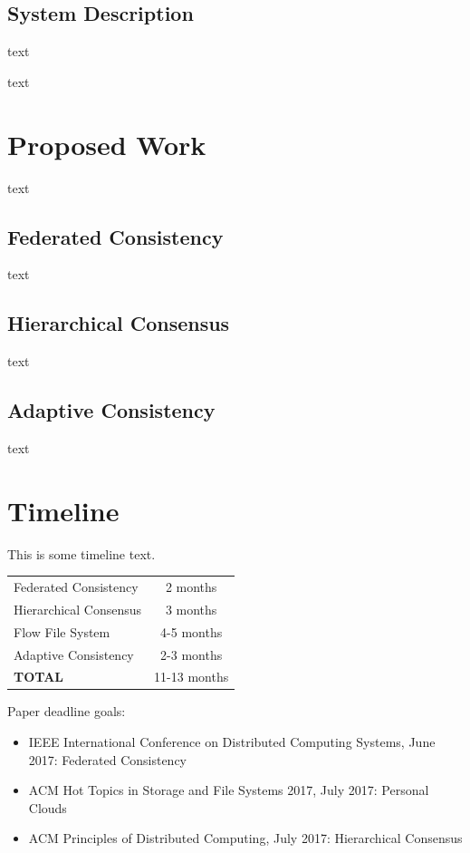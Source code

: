 \documentclass{article}
\begin{document}
\subsection{System Description}

text



text

\section{Proposed Work}

text

\subsection{Federated Consistency}

text

\subsection{Hierarchical Consensus}

text

\subsection{Adaptive Consistency}

text

\section{Timeline}

This is some timeline text.

\begin{center}
\begin{tabular}{|l|c|}
\hline
Federated Consistency & 2 months \\
Hierarchical Consensus & 3 months \\
Flow File System & 4-5 months \\
Adaptive Consistency & 2-3 months \\
\hline
\textbf{TOTAL} & 11-13 months \\
\hline
\end{tabular}
\end{center}

Paper deadline goals:

\begin{itemize}
\item IEEE International Conference on Distributed Computing Systems, June 2017: Federated Consistency
\item ACM Hot Topics in Storage and File Systems 2017, July 2017: Personal Clouds
\item ACM Principles of Distributed Computing, July 2017: Hierarchical Consensus
\end{itemize}
\end{document}
